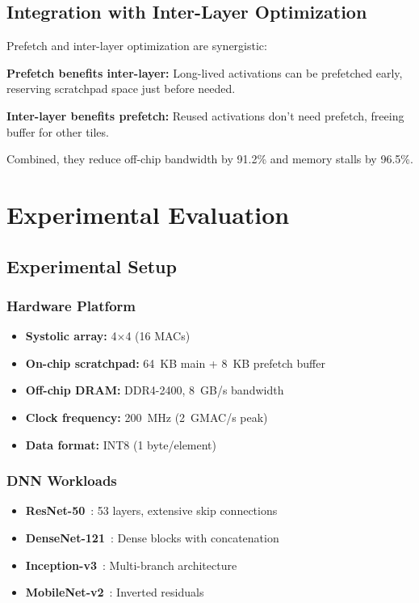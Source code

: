 \documentclass[journal]{IEEEtran}
\begin{document}
\subsection{Integration with Inter-Layer Optimization}

Prefetch and inter-layer optimization are synergistic:

\textbf{Prefetch benefits inter-layer:} Long-lived activations can be prefetched early, reserving scratchpad space just before needed.

\textbf{Inter-layer benefits prefetch:} Reused activations don't need prefetch, freeing buffer for other tiles.

Combined, they reduce off-chip bandwidth by 91.2\% and memory stalls by 96.5\%.

\section{Experimental Evaluation}

\subsection{Experimental Setup}

\subsubsection{Hardware Platform}
\begin{itemize}
\item \textbf{Systolic array:} 4$\times$4 (16 MACs)
\item \textbf{On-chip scratchpad:} 64~KB main + 8~KB prefetch buffer
\item \textbf{Off-chip DRAM:} DDR4-2400, 8~GB/s bandwidth
\item \textbf{Clock frequency:} 200~MHz (2~GMAC/s peak)
\item \textbf{Data format:} INT8 (1 byte/element)
\end{itemize}

\subsubsection{DNN Workloads}
\begin{itemize}
\item \textbf{ResNet-50}~\cite{he2016resnet}: 53 layers, extensive skip connections
\item \textbf{DenseNet-121}~\cite{huang2017densenet}: Dense blocks with concatenation
\item \textbf{Inception-v3}~\cite{szegedy2015inception}: Multi-branch architecture
\item \textbf{MobileNet-v2}~\cite{sandler2018mobilenetv2}: Inverted residuals
\end{itemize}
\end{document}
